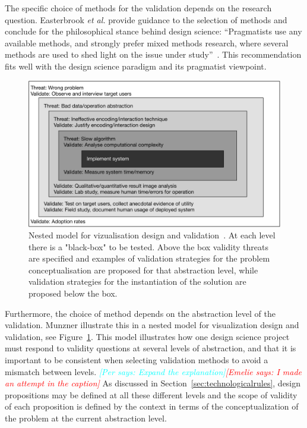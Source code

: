 \documentclass[graybox]{svmult}
\newcommand{\emelie}[1]{\textcolor{red}{{\it [Emelie says: #1]}}}
\newcommand{\per}[1]{\textcolor{cyan}{{\it [Per says: #1]}}}
\newcommand{\emelie}[1]{}
\newcommand{\per}[1]{}
\begin{document}
The specific choice of methods for the validation depends on the research question. Easterbrook \emph{et al.} provide guidance to the selection of methods and conclude for the philosophical stance behind design science: ``Pragmatists use any available methods, and strongly prefer mixed methods research, where several methods are used to shed light on the issue under study''~\cite{easterbrook_selecting_2008}. 
This recommendation fits well with the design science paradigm and its pragmatist viewpoint.

\begin{figure}[t]
  \includegraphics[width=\textwidth]{Figures/nested_model.pdf}
\caption{Nested model for vizualisation design and validation~\cite{munzner2009}. At each level there is a "black-box" to be tested. Above the box validity threats are specified and examples of validation strategies for the problem conceptualisation are proposed for that abstraction level, while validation strategies for the instantiation of the solution are proposed below the box.}\label{fig:nested_model}       %
\end{figure} 

Furthermore, the choice of method depends on the abstraction level of the validation. Munzner illustrate this in a nested model for visualization design and validation, see Figure~\ref{fig:nested_model}. This model illustrates how one design science project must respond to validity questions at several levels of abstraction, and that it is important to be consistent when selecting validation methods to avoid a mismatch between levels. \per{Expand the explanation}\emelie{I made an attempt in the caption} As discussed in Section~\ref{sec:technologicalrules}, design propositions may be defined at all these different levels and the scope of validity of each proposition is defined by the context in terms of the conceptualization of the problem at the current abstraction level.
\end{document}
